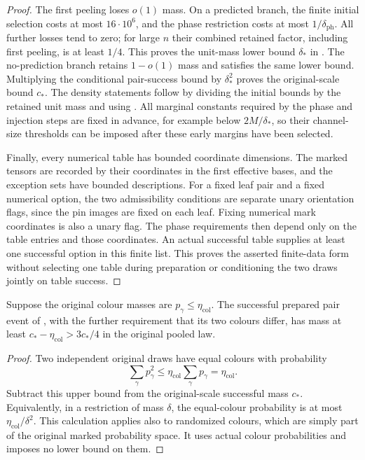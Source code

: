 \begin{proof}
The first peeling loses \(o(1)\) mass.  On a predicted branch,
the finite initial selection costs at most \(16\cdot10^6\), and
the phase restriction costs at most \(1/\delta_{\mathrm{ph}}\).
All further losses tend to zero; for large \(n\) their combined
retained factor, including first peeling, is at least \(1/4\).
This proves the unit-mass lower bound \(\delta_*\) in
.  The no-prediction branch
retains \(1-o(1)\) mass and satisfies the same lower bound.
Multiplying the conditional pair-success bound by
\(\delta_*^2\) proves the original-scale bound \(c_*\).
The density statements follow by dividing the initial bounds by
the retained unit mass and using .
All marginal constants required by the phase and injection steps
are fixed in advance, for example below \(2M/\delta_*\), so their
channel-size thresholds can be imposed after these early margins
have been selected.

Finally, every numerical table has bounded coordinate dimensions.
The marked tensors are recorded by their coordinates in the first
effective bases, and the exception sets have bounded descriptions.
For a fixed leaf pair and a fixed numerical option, the two
admissibility conditions are separate unary orientation flags,
since the pin images are fixed on each leaf.  Fixing numerical
mark coordinates is also a unary flag.  The phase requirements
then depend only on the table entries and those coordinates.
An actual successful table supplies at least one successful
option in this finite list.  This proves the asserted finite-data
form without selecting one table during preparation or conditioning
the two draws jointly on table success.
\end{proof}

\begin{corollary}
\label{tp:preparation-colours}
Suppose the original colour masses are \(p_\gamma\le
\eta_{\mathrm{col}}\).  The successful prepared pair event of
, with the further requirement that
its two colours differ, has mass at least
\(c_*-\eta_{\mathrm{col}}>3c_*/4\) in the original pooled law.
\end{corollary}

\begin{proof}
Two independent original draws have equal colours with probability
\[
 \sum_\gamma p_\gamma^2\le
 \eta_{\mathrm{col}}\sum_\gamma p_\gamma=\eta_{\mathrm{col}}.
\]
Subtract this upper bound from the original-scale successful mass
\(c_*\).  Equivalently, in a restriction of mass \(\delta\), the
equal-colour probability is at most
\(\eta_{\mathrm{col}}/\delta^2\).  This calculation applies also
to randomized colours, which are simply part of the original
marked probability space.  It uses actual colour probabilities
and imposes no lower bound on them.
\end{proof}

